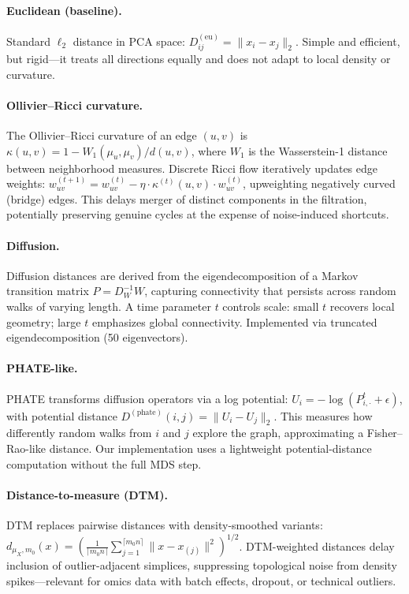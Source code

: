 \documentclass[12pt]{article}
\begin{document}
\paragraph{Euclidean (baseline).}
Standard $\ell_2$ distance in PCA space: $D^{(\text{eu})}_{ij} = \|x_i - x_j\|_2$.
Simple and efficient, but rigid---it treats all directions equally and does not adapt to local density or curvature.

\paragraph{Ollivier--Ricci curvature.}
The Ollivier--Ricci curvature \cite{ollivier2007,ollivier2009} of an edge $(u,v)$ is $\kappa(u,v) = 1 - W_1(\mu_u, \mu_v)/d(u,v)$, where $W_1$ is the Wasserstein-1 distance between neighborhood measures.
Discrete Ricci flow \cite{ni2019community} iteratively updates edge weights: $w_{uv}^{(t+1)} = w_{uv}^{(t)} - \eta \cdot \kappa^{(t)}(u,v) \cdot w_{uv}^{(t)}$, upweighting negatively curved (bridge) edges.
This delays merger of distinct components in the filtration, potentially preserving genuine cycles at the expense of noise-induced shortcuts.

\paragraph{Diffusion.}
Diffusion distances \cite{coifman2006diffusion} are derived from the eigendecomposition of a Markov transition matrix $P = D_W^{-1}W$, capturing connectivity that persists across random walks of varying length.
A time parameter $t$ controls scale: small $t$ recovers local geometry; large $t$ emphasizes global connectivity.
Implemented via truncated eigendecomposition (50 eigenvectors).

\paragraph{PHATE-like.}
PHATE \cite{moon2019phate} transforms diffusion operators via a log potential: $U_i = -\log(P^t_{i,\cdot} + \epsilon)$, with potential distance $D^{(\text{phate})}(i,j) = \|U_i - U_j\|_2$.
This measures how differently random walks from $i$ and $j$ explore the graph, approximating a Fisher--Rao-like distance.
Our implementation uses a lightweight potential-distance computation without the full MDS step.

\paragraph{Distance-to-measure (DTM).}
DTM \cite{chazal2011dtm, chazal2017robust} replaces pairwise distances with density-smoothed variants: $d_{\mu_X, m_0}(x) = (\frac{1}{\lceil m_0 n \rceil} \sum_{j=1}^{\lceil m_0 n \rceil} \|x - x_{(j)}\|^2)^{1/2}$.
DTM-weighted distances delay inclusion of outlier-adjacent simplices, suppressing topological noise from density spikes---relevant for omics data with batch effects, dropout, or technical outliers.
\end{document}
